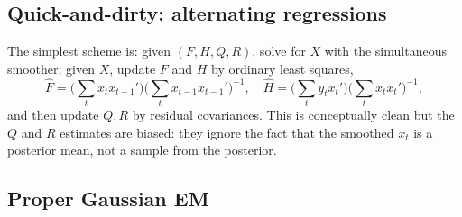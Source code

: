 \documentclass[11pt]{article}
\begin{document}
\subsection{Quick-and-dirty: alternating regressions}

The simplest scheme is: given $(F,H,Q,R)$, solve for $X$ with the
simultaneous smoother; given $X$, update $F$ and $H$ by ordinary least
squares,
\begin{equation}
\widehat F=\bigl(\textstyle\sum_t x_tx_{t-1}'\bigr)\bigl(\textstyle\sum_t x_{t-1}x_{t-1}'\bigr)^{-1},
\quad
\widehat H=\bigl(\textstyle\sum_t y_tx_t'\bigr)\bigl(\textstyle\sum_t x_tx_t'\bigr)^{-1},
\end{equation}
and then update $Q,R$ by residual covariances.  This is conceptually
clean but the $Q$ and $R$ estimates are biased: they ignore the fact
that the smoothed $x_t$ is a posterior mean, not a sample from the
posterior.

\subsection{Proper Gaussian EM}
\end{document}
